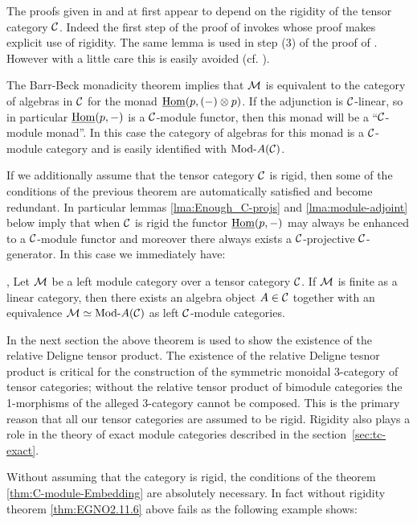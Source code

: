 \documentclass{amsart}
\begin{document}
\noindent The proofs given in \cite{EGNO} and \cite{MR1976459} at first appear to depend on  the rigidity of the tensor category $\mathcal C$. Indeed the first step of the proof of \cite[Thm 2.11.2]{EGNO} invokes \cite[lemma 2.10.4.(4)]{EGNO} whose proof makes explicit use of rigidity. The same lemma is used in step (3) of the proof of \cite[Thm 1]{MR1976459}. However with a little care this is easily avoided (cf. \cite[Rmk. 2.11.3]{EGNO}). 

The Barr-Beck monadicity theorem implies that $\mathcal M$ is equivalent to the category of algebras in $\mathcal C$ for the monad $\operatorname{\underline{Hom}}(p, (-) \otimes p)$. If the adjunction is $\mathcal C$-linear, so in particular $\operatorname{\underline{Hom}}(p,-)$ is a $\mathcal C$-module functor, then this monad will be a ``$\mathcal C$-module monad''. In this case the category of algebras for this monad is a $\mathcal C$-module category and is easily identified with $\Mod{}{A}(\cC)$. 

If we additionally assume that the tensor category $\mathcal C$ is rigid, then some of the conditions of the previous theorem are automatically satisfied and become redundant. In particular lemmas \ref{lma:Enough_C-projs} and \ref{lma:module-adjoint} below imply that when $\mathcal C$ is rigid the functor $\operatorname{\underline{Hom}}(p,-)$ may always be enhanced to a $\mathcal C$-module functor and moreover there always exists a $\mathcal C$-projective $\mathcal C$-generator. In this case we immediately have: 

\begin{theorem}{\cite[Thm 2.11.6]{EGNO}, \cite[Thm 1]{MR1976459}} \label{thm:EGNO2.11.6}
	Let $\mathcal M$ be a left module category over a tensor category $\mathcal C$. If $\mathcal M$ is finite as a linear category, then there exists an algebra object $A \in \mathcal C$ together with an equivalence $\cM \simeq \Mod{}{A} (\cC)$ as left $\mathcal C$-module categories.
\end{theorem}

In the next section the above theorem is used to show the existence of the relative Deligne tensor product. The existence of the relative Deligne tesnor product is critical for the construction of the symmetric monoidal 3-category of tensor categories; without the relative tensor product of bimodule categories the 1-morphisms of the alleged 3-category cannot be composed. This is the primary reason that all our tensor categories are assumed to be rigid. Rigidity also plays a role in the theory of exact module categories described in the section~\ref{sec:tc-exact}.

Without assuming that the category is rigid, the conditions of the theorem \ref{thm:C-module-Embedding} are absolutely necessary. In fact without rigidity theorem \ref{thm:EGNO2.11.6} above fails as the following example shows: 
\end{document}
